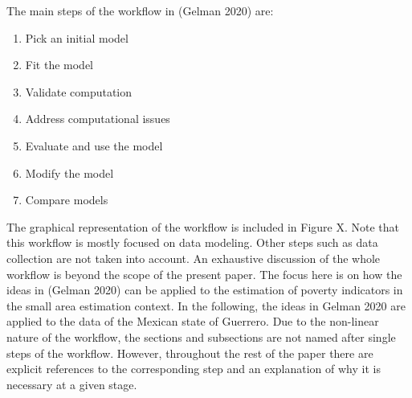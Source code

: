 The main steps of the workflow in (Gelman 2020) are:
\begin{enumerate}
    \setlength\itemsep{0.1em}
    \item Pick an initial model
    \item Fit the model
    \item Validate computation
    \item Address computational issues
    \item Evaluate and use the model
    \item Modify the model
    \item Compare models
\end{enumerate}
The graphical representation of the workflow is included in Figure X.
Note that this workflow is mostly focused on data modeling.
Other steps such as data collection are not taken into account.
An exhaustive discussion of the whole workflow is beyond the scope of the present paper.
The focus here is on how the ideas in (Gelman 2020) can be applied to the estimation of poverty indicators in the small area estimation context.
In the following, the ideas in Gelman 2020 are applied to the data of the Mexican state of Guerrero.
Due to the non-linear nature of the workflow, the sections and subsections are not named after single steps of the workflow.
However, throughout the rest of the paper there are explicit references to the corresponding step and an explanation of why it is necessary at a given stage.

